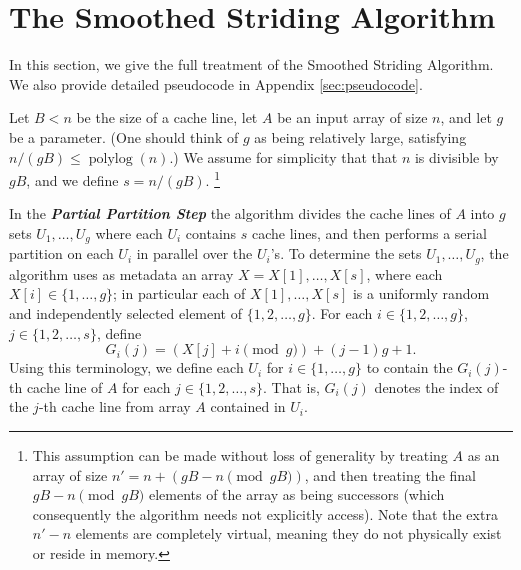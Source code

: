 \documentclass[a4paper,UKenglish,cleveref, autoref, thm-restate]{lipics-v2019}
\DeclareMathOperator{\polylog}{\text{polylog}}
\newcommand{\defn}[1]{{\textit{\textbf{\boldmath #1}}}}
\renewcommand{\paragraph}[1]{\vspace{0.09in}\noindent{\bf \boldmath #1.}}
\begin{document}

\section{The Smoothed Striding Algorithm}\label{sec:recursiveSmoothedStridingfull}

In this section, we give the full treatment of the Smoothed Striding
Algorithm. We also provide detailed pseudocode in Appendix
\ref{sec:pseudocode}.

\paragraph{Formal Algorithm Description} Let $B < n$ be the size
of a cache line, let $A$ be an input array of size $n$, and let
$g$ be a parameter. (One should think of $g$ as being relatively
large, satisfying $n/(gB) \le \polylog(n)$.)  We assume for
simplicity that that $n$ is divisible by $gB$, and we define $s =
n/(gB)$. \footnote{This assumption can be made without loss of
  generality by treating $A$ as an array of size $n' = n + {(gB -
  n \pmod {gB})}$, and then treating the final $gB - n \pmod
  {gB}$ elements of the array as being successors (which
  consequently the algorithm needs not explicitly access). Note
  that the extra $n' - n$ elements are completely virtual,
  meaning they do not physically exist or reside in memory.
}

In the \defn{Partial Partition Step} the algorithm divides the
cache lines of $A$ into $g$ sets $U_1, \ldots, U_{g}$ where each
$U_i$ contains $s$ cache lines, and then performs a serial
partition on each $U_i$ in parallel over the $U_i$'s. To
determine the sets $U_1, \ldots, U_{g}$, the algorithm uses as
metadata an array $X = X[1], \ldots, X[s]$, where each $X[i] \in
\{1, \ldots, g\}$; in particular each of $X[1], \ldots, X[s]$ is
a uniformly random and independently selected element of $\{1, 2,
\ldots, g\}$. For each $i \in \{1, 2, \ldots, g\}$, $j \in \{1,
2, \ldots, s\}$, define $$G_i(j) = (X[j] + i \pmod g) + (j - 1)g
+ 1.$$ Using this terminology, we define each $U_i$ for $i \in
\{1, \ldots, g\}$ to contain the $G_i(j)$-th cache line of $A$
for each $j \in \{1, 2, \ldots, s\}$. That is, $G_i(j)$ denotes
the index of the $j$-th cache line from array $A$ contained in
$U_i$.
\end{document}
